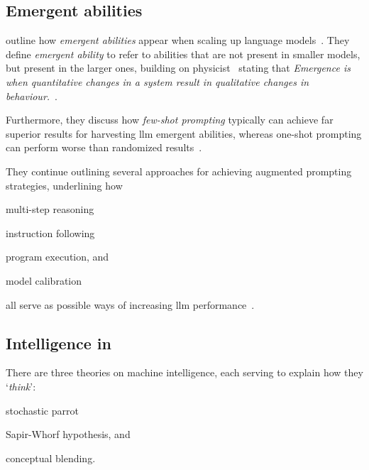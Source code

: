 \subsection{Emergent abilities}\label{sec:emergentAbilities}

\citeauthor{emergentabilitiesLLM} outline how \textit{emergent abilities} appear
when scaling up language models~\cite[1]{emergentabilitiesLLM}. They define
\textit{emergent ability} to refer to abilities that are not present in smaller
models, but present in the larger ones\cite[1]{emergentabilitiesLLM}, building
on physicist~\citeauthor{anderson1972more} stating that \textit{Emergence is
    when quantitative changes in a system result in qualitative changes in
    behaviour.}~\cite[2]{emergentabilitiesLLM}.

Furthermore, they discuss how \textit{few-shot prompting} typically can achieve
far superior results for harvesting \acrshort{llm} emergent abilities, whereas
one-shot prompting can perform worse than randomized
results~\cite[3-4]{emergentabilitiesLLM}.

They continue outlining several approaches for achieving augmented prompting
strategies, underlining how \begin{inparaenum}
    \item multi-step reasoning
    \item instruction following
    \item program execution,
    and
    \item model calibration
\end{inparaenum}
all serve as possible ways of increasing \acrshort{llm} performance~\cite[5]{emergentabilitiesLLM}.


\subsection{Intelligence in }\label{sec:llmIntelligence}

There are three theories on machine intelligence, each serving to
explain how they `\textit{think}': \begin{inparaenum}
    \item stochastic parrot
    \item Sapir-Whorf hypothesis,
    and
    \item conceptual blending.
\end{inparaenum}

